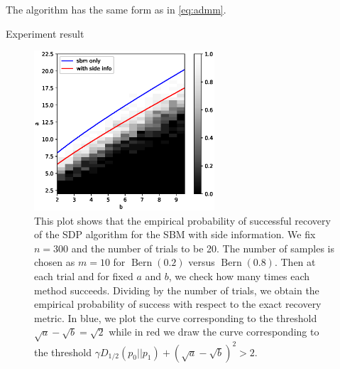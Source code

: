 \documentclass{ctexart}
\DeclareMathOperator{\Bern}{Bern}
\begin{document}
The algorithm has the same form as in \eqref{eq:admm}.

Experiment result

\begin{figure}
	\centering
	\includegraphics[width=0.6\textwidth]{sdp_si.eps}
	\caption{This plot shows that the empirical probability of successful recovery of the SDP algorithm 
	for the SBM with side information. We fix $n=300$ and the number of trials to be 20. The number of samples is chosen as $m=10$ for $\Bern(0.2)$ versus $\Bern(0.8)$. Then
	at each trial and for fixed $a$ and $b$, we check how many times each method succeeds. Dividing
	by the number of trials, we obtain the empirical probability of success with respect to
	the exact recovery metric. In blue, we plot the curve corresponding to the threshold $\sqrt{a}-\sqrt{b}=\sqrt{2}$ while in red we draw the curve corresponding to the threshold $\gamma D_{1/2}(p_0||p_1)  + (\sqrt{a} - \sqrt{b})^2 > 2$.}
\end{figure}
\end{document}
